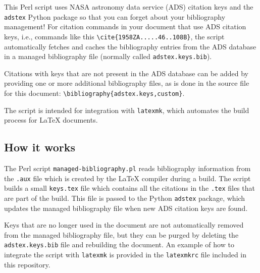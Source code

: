 This Perl script uses NASA astronomy data service (ADS) citation keys and the \texttt{adstex} Python package so that you can forget about your bibliography management! For citation commands in your document that use ADS citation keys, i.e., commands like this 
\texttt{\textbackslash{}cite\{1958ZA.....46..108B\}}, the script automatically fetches and caches the bibliography entries from the ADS database in a managed bibliography file (normally called \texttt{adstex.keys.bib}).

Citations with keys that are not present in the ADS database can be added by providing one or more additional bibliography files, as is done in the source file for this document: \texttt{\textbackslash{}bibliography\{adstex.keys,custom\}}. 

The script is intended for integration with \texttt{latexmk}, which automates the build process for LaTeX documents.

\subsection*{How it works}
The Perl script \texttt{managed-bibliography.pl} reads bibliography information from the \texttt{.aux} file which is created by the LaTeX compiler during a build. The script builds a small \texttt{keys.tex} file which contains all the citations in the \texttt{.tex} files that are part of the build. This file is passed to the Python \texttt{adstex} package, which updates the managed bibliography file when new ADS citation keys are found. 

Keys that are no longer used in the document are not automatically removed from the managed bibliography file, but they can be purged by deleting the \texttt{adstex.keys.bib} file and rebuilding the document. An example of how to integrate the script with \texttt{latexmk} is provided in the \texttt{latexmkrc} file included in this repository.
